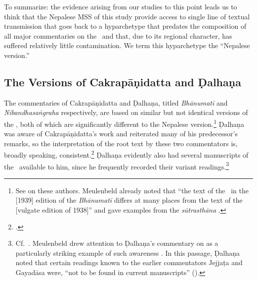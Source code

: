 %
%

To summarize: the evidence arising from our studies to this point leads us to
think that the Nepalese MSS of this study provide access to single line of textual
transmission that goes back to a hyparchetype that predates the composition of all
major commentaries on the \SS\ and that, due to its regional character, has
suffered relatively little contamination. We term this hyparchetype the “Nepalese
version.” 


\subsection{The Versions of Cakrapāṇidatta and Ḍalhaṇa}

The commentaries of Cakrapāṇidatta and Ḍalhaṇa, titled \emph{Bhānumatī} and
\emph{Nibandhasaṅgraha} respectively, are based on similar but not identical
versions of the \SS, both of which are significantly different to the Nepalese
version.\footnote{See \cite[IA 374--379]{meul-hist} on these authors. Meulenbeld
already noted that “the text of the \SS\ in the [1939] edition of the
\emph{Bhānumatī} differs at many places from the text of the [vulgate edition of
1938]” and gave examples from the \emph{sūtrasthāna} \citep[IB, 496, note
76]{meul-hist}.} Ḍalhaṇa was aware of Cakrapāṇidatta's work and reiterated many of
his predecessor's remarks, so the interpretation of the root text by these two
commentators is, broadly speaking, consistent.\footcite[IB, 499,
n.\,162]{meul-hist}  Ḍalhaṇa evidently also had several manuscripts of the \SS\
available to him, since he frequently recorded their variant
readings.\footnote{Cf.\ \cite[IA, 377]{meul-hist}.  Meulenbeld drew attention to
Ḍalhaṇa's commentary on \Su{5.8.24cd--25ab}{587} as a particularly striking
example of such awareness \citep[IB, 497, n.\,112]{meul-hist}.  In this passage, Ḍalhaṇa
noted that certain readings known to the earlier commentators Jejjaṭa and Gayadāsa
were, “not to be found in current manuscripts” 
().}

